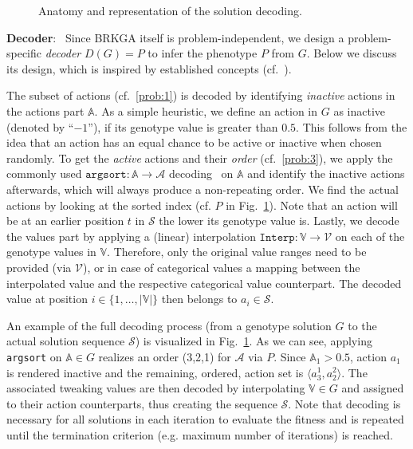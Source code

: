 \documentclass[runningheads, envcountsame, a4paper]{llncs}
\newcommand{\actions}{\mathcal{A}}
\newcommand{\action}{a}
\newcommand{\actionspart}{\mathbb{A}}
\newcommand{\Values}{\mathcal{V}}
\newcommand{\valuespart}{\mathbb{V}}
\newcommand{\sequence}{\mathcal{S}}
\newcommand{\genotype}{G}
\newcommand{\phenotype}{P}
\newcommand{\decoder}{D}
\begin{document}
\begin{figure}[!ht]
	\centering
	
	\caption{Anatomy and representation of the solution decoding.}
	\label{fig:decoder}
\end{figure}

\textbf{Decoder}: \,
Since BRKGA itself is problem-independent, we design a problem-specific \emph{decoder} $\decoder(\genotype) = \phenotype$ to infer the phenotype $\phenotype$ from $\genotype$.
Below we discuss its design, which is inspired by established concepts (cf.~\cite{goncalvesBiasedRandomkeyGenetic2011}).

The subset of actions (cf.~\ref{prob:1}) is decoded by identifying \emph{inactive} actions in the actions part $\actionspart$. As a simple heuristic, we define an action in $\genotype$ as inactive (denoted by \enquote{$-1$}), if its genotype value is greater than $0.5$. This follows from the idea that an action has an equal chance to be active or inactive when chosen randomly.
To get the \emph{active} actions and their \emph{order} (cf.~\ref{prob:3}), we apply the commonly used $\texttt{argsort}: \actionspart \to \actions$ decoding~\cite{goncalvesBiasedRandomkeyGenetic2011,beanGeneticAlgorithmsRandom1994} on $\actionspart$ and identify the inactive actions afterwards, which will always produce a non-repeating order. We find the actual actions by looking at the sorted index (cf. $\phenotype$ in Fig.~\ref{fig:decoder}). Note that an action will be at an earlier position $t$ in $\sequence$ the lower its genotype value is.
%
Lastly, we decode the values part by applying a (linear) interpolation $\texttt{Interp}: \valuespart \to \Values$ on each of the genotype values in $\valuespart$.
Therefore, only the original value ranges need to be provided (via $\Values$), or in case of categorical values a mapping between the interpolated value and the respective categorical value counterpart. The decoded value at position $i \in \{1,\dots,|\valuespart|\}$ then belongs to $\action_i \in \sequence$.

An example of the full decoding process (from a genotype solution $\genotype$ to the actual solution sequence $\sequence$) is visualized in Fig.~\ref{fig:decoder}.
As we can see, applying \texttt{argsort} on $\actionspart \in \genotype$ realizes an order (3,2,1) for $\actions$ via $\phenotype$. Since $\actionspart_1 > 0.5$, action $\action_1$ is rendered inactive and the remaining, ordered, action set is $\langle \action^1_3, \action^2_2 \rangle$. The associated tweaking values are then decoded by interpolating $\valuespart \in \genotype$ and assigned to their action counterparts, thus creating the sequence $\sequence$.
Note that decoding is necessary for all solutions in each iteration to evaluate the fitness and is repeated until the termination criterion (e.g. maximum number of iterations) is reached.
\end{document}
